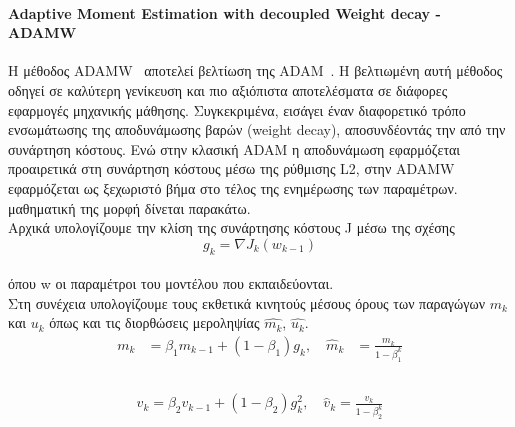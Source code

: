 \documentclass[12pt]{article}
\numberwithin{equation}{section}
\begin{document}
\paragraph{Adaptive Moment Estimation with decoupled Weight decay - ADAMW\\[0.5 cm]}

Η μέθοδος ADAMW~\cite{loshchilov2019decoupledweightdecayregularization} αποτελεί βελτίωση της ADAM~\cite{kingma2017adammethodstochasticoptimization}. Η βελτιωμένη αυτή μέθοδος οδηγεί σε καλύτερη γενίκευση και πιο αξιόπιστα αποτελέσματα σε διάφορες εφαρμογές μηχανικής μάθησης. Συγκεκριμένα, εισάγει έναν διαφορετικό τρόπο ενσωμάτωσης της αποδυνάμωσης βαρών (weight decay), αποσυνδέοντάς την από την συνάρτηση κόστους. Ενώ στην κλασική ADAM η αποδυνάμωση εφαρμόζεται προαιρετικά στη συνάρτηση κόστους μέσω της ρύθμισης L2, στην ADAMW εφαρμόζεται ως ξεχωριστό βήμα στο τέλος της ενημέρωσης των παραμέτρων. μαθηματική της μορφή δίνεται παρακάτω.\\

\noindent Αρχικά υπολογίζουμε την κλίση της συνάρτησης κόστους J μέσω της σχέσης \\

\begin{equation}
g_{k} = \nabla J_{k}(w_{k-1})
\end{equation}\\

\noindent όπου w οι παραμέτροι του μοντέλου που εκπαιδεύονται.\\

\noindent Στη συνέχεια υπολογίζουμε τους εκθετικά κινητούς μέσους όρους των παραγώγων \(m_k\) και \(u_k\) όπως και τις διορθώσεις μεροληψίας \(\hat{m_k}\), \(\hat{u_k}\).\\


\begin{equation}
\begin{aligned}
m_k &= \beta_1 m_{k-1} + (1 - \beta_1) g_k, \quad
\hat{m}_k &= \frac{m_k}{1 - \beta_1^k}\\
\end{aligned}
\end{equation}\\

\begin{equation}
\begin{aligned}
v_k = \beta_2 v_{k-1} + (1 - \beta_2) g_k^2, \quad 
\hat{v}_k = \frac{v_k}{1 - \beta_2^k}
\end{aligned}
\end{equation}\\
\end{document}
